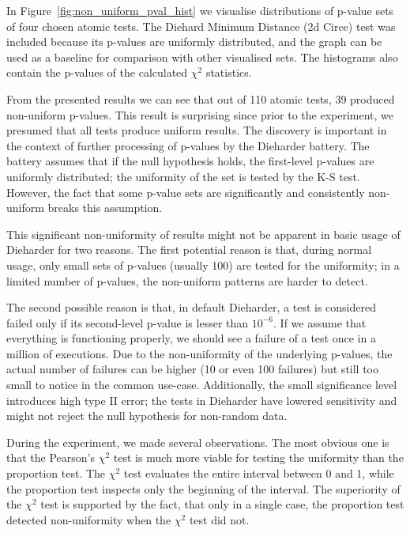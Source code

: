 \documentclass[
	digital,    %
	oneside,
	color,
	11pt,
	nocover,
	notable,
	nolof,
	nolot,
]{fithesis3}
\theoremstyle{definition}
\theoremstyle{remark}
\begin{document}
In Figure~\ref{fig:non_uniform_pval_hist} we visualise distributions of p-value sets of four chosen atomic tests. The Diehard Minimum Distance (2d Circe) test was included because its p-values are uniformly distributed, and the graph can be used as a baseline for comparison with other visualised sets. The histograms also contain the p-values of the calculated $\chi^2$ statistics.

From the presented results we can see that out of 110 atomic tests, 39 produced non-uniform p-values. This result is surprising since prior to the experiment, we presumed that all tests produce uniform results. The discovery is important in the context of further processing of p-values by the Dieharder battery. The battery assumes that if the null hypothesis holds, the first-level p-values are uniformly distributed; the uniformity of the set is tested by the K-S test. However, the fact that some p-value sets are significantly and consistently non-uniform breaks this assumption.

This significant non-uniformity of results might not be apparent in basic usage of Dieharder for two reasons. The first potential reason is that, during normal usage, only small sets of p-values (usually 100) are tested for the uniformity; in a limited number of p-values, the non-uniform patterns are harder to detect. 

The second possible reason is that, in default Dieharder, a test is considered failed only if its second-level p-value is lesser than $10^{-6}$. If we assume that everything is functioning properly, we should see a failure of a test once in a million of executions. Due to the non-uniformity of the underlying p-values, the actual number of failures can be higher (10 or even 100 failures) but still too small to notice in the common use-case. Additionally, the small significance level introduces high type II error; the tests in Dieharder have lowered sensitivity and might not reject the null hypothesis for non-random data.

During the experiment, we made several observations. The most obvious one is that the Pearson's $\chi^2$ test is much more viable for testing the uniformity than the proportion test. The $\chi^2$ test evaluates the entire interval between 0 and 1, while the proportion test inspects only the beginning of the interval. The superiority of the $\chi^2$ test is supported by the fact, that only in a single case, the proportion test detected non-uniformity when the $\chi^2$ test did not. 
\end{document}
